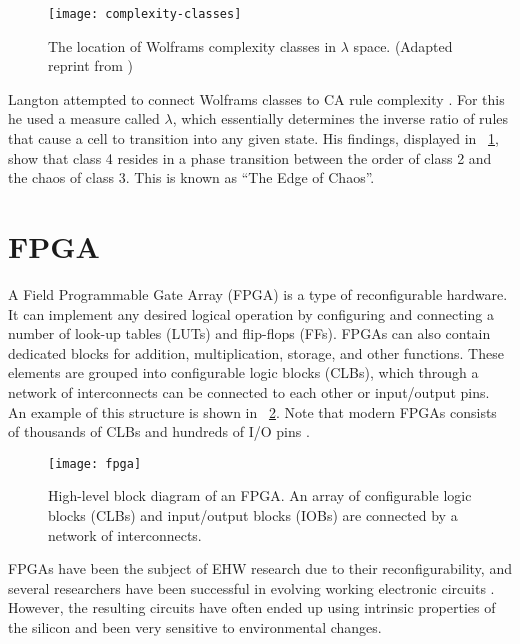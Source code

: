 \begin{figure}[!ht]
    \centering
    \texttt{[image: complexity-classes]}
    \caption[Complexity classes]{
        The location of Wolframs complexity classes in $\lambda$ space.
        (Adapted reprint from \cite{langton1990edgeofchaos})
    }
    \label{fig:complexity-classes}
\end{figure}

Langton attempted to connect Wolframs classes to CA rule complexity \cite{langton1990edgeofchaos}.
For this he used a measure called $\lambda$, which essentially determines the inverse ratio of rules that cause a cell to transition into any given state.
His findings, displayed in \figurename~\ref{fig:complexity-classes}, show that class 4 resides in a phase transition between the order of class 2 and the chaos of class 3.
This is known as ``The Edge of Chaos''.



\section{FPGA}

A Field Programmable Gate Array (FPGA) is a type of reconfigurable hardware.
It can implement any desired logical operation by configuring and connecting a number of look-up tables (LUTs) and flip-flops (FFs).
FPGAs can also contain dedicated blocks for addition, multiplication, storage, and other functions.
These elements are grouped into configurable logic blocks (CLBs), which through a network of interconnects can be connected to each other or input/output pins.
An example of this structure is shown in \figurename~\ref{fig:fpga}.
Note that modern FPGAs consists of thousands of CLBs and hundreds of I/O pins \cite{ds160}.

\begin{figure}[!ht]
    \centering
    \texttt{[image: fpga]}
    \caption[FPGA]{
        High-level block diagram of an FPGA.
        An array of configurable logic blocks (CLBs) and input/output blocks (IOBs) are connected by a network of interconnects.
    }
    \label{fig:fpga}
\end{figure}

FPGAs have been the subject of EHW research due to their reconfigurability, and several researchers have been successful in evolving working electronic circuits \cite{huelsbergen1998evolution, thompson1997evolved}.
However, the resulting circuits have often ended up using intrinsic properties of the silicon and been very sensitive to environmental changes.

